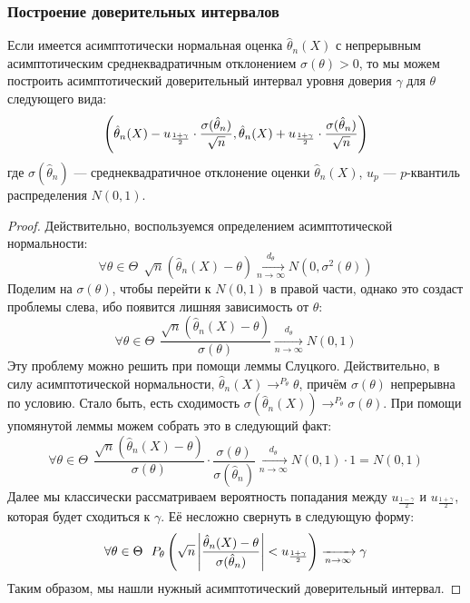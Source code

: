 \subsubsection{Построение доверительных интервалов}

\begin{proposition}
	Если имеется асимптотически нормальная оценка $\hat{\theta}_n(X)$ с непрерывным асимптотическим среднеквадратичным отклонением $\sigma(\theta) > 0$, то мы можем построить асимптотический доверительный интервал уровня доверия $\gamma$ для $\theta$ следующего вида:
	\[
		\left(\hat{\theta}_n(X) - u_{\frac{1 + \gamma}{2}} \cdot \frac{\sigma(\hat{\theta}_n)}{\sqrt{n}}, \hat{\theta}_n(X) + u_{\frac{1 + \gamma}{2}} \cdot \frac{\sigma(\hat{\theta}_n)}{\sqrt{n}}\right)
	\]
	где $\sigma(\hat{\theta}_n)$ --- среднеквадратичное отклонение оценки $\hat{\theta}_n(X)$, $u_p$ --- $p$-квантиль распределения $N(0, 1)$.
\end{proposition}

\begin{proof}
	Действительно, воспользуемся определением асимптотической нормальности:
	\[
		\forall \theta \in \Theta\ \ \sqrt{n}(\hat{\theta}_n(X) - \theta) \xrightarrow[n \to \infty]{d_\theta} N(0, \sigma^2(\theta))
	\]
	Поделим на $\sigma(\theta)$, чтобы перейти к $N(0, 1)$ в правой части, однако это создаст проблемы слева, ибо появится лишняя зависимость от $\theta$:
	\[
		\forall \theta \in \Theta\ \ \frac{\sqrt{n}(\hat{\theta}_n(X) - \theta)}{\sigma(\theta)} \xrightarrow[n \to \infty]{d_\theta} N(0, 1)
	\]
	Эту проблему можно решить при помощи леммы Слуцкого. Действительно, в силу асимптотической нормальности, $\hat{\theta}_n(X) \to^{P_\theta} \theta$, причём $\sigma(\theta)$ непрерывна по условию. Стало быть, есть сходимость $\sigma(\hat{\theta}_n(X)) \to^{P_\theta} \sigma(\theta)$. При помощи упомянутой леммы можем собрать это в следующий факт:
	\[
		\forall \theta \in \Theta\ \ \frac{\sqrt{n}(\hat{\theta}_n(X) - \theta)}{\sigma(\theta)} \cdot \frac{\sigma(\theta)}{\sigma(\hat{\theta}_n)} \xrightarrow[n \to \infty]{d_\theta} N(0, 1) \cdot 1 = N(0, 1)
	\]
	Далее мы классически рассматриваем вероятность попадания между $u_{\frac{1 - \gamma}{2}}$ и $u_{\frac{1 + \gamma}{2}}$, которая будет сходиться к $\gamma$. Её несложно свернуть в следующую форму:
	\[
		\forall \theta \in \Theta\ \ P_\theta\ps{\sqrt{n}\md{\frac{\hat{\theta}_n(X) - \theta}{\sigma(\hat{\theta}_n)}} < u_{\frac{1 + \gamma}{2}}} \xrightarrow[n \to \infty]{} \gamma
	\]
	Таким образом, мы нашли нужный асимптотический доверительный интервал.
\end{proof}

